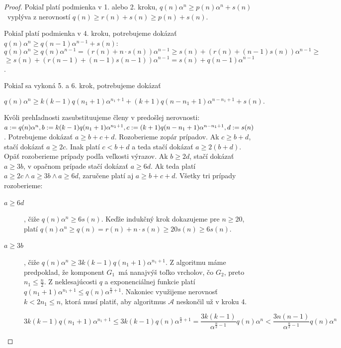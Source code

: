 \begin{proof}
    Pokiaľ platí podmienka v 1. alebo 2. kroku,
    $q(n) \alpha^n \ge p(n) \alpha^n + s(n)$ vyplýva z nerovností $q(n) \ge r(n) + s(n) \ge p(n) + s(n)$.

    Pokiaľ platí podmienka v 4. kroku, potrebujeme dokázať $q(n) \alpha^n \ge q(n-1) \alpha^{n-1} + s(n)$:
    $$ q(n) \alpha^n \ge q(n) \alpha^{n-1} = \left(r(n) + n \cdot s(n) \right) \alpha^{n-1} \ge s(n) + \left(r(n) + (n-1)s(n) \right) \alpha^{n-1} \ge $$
    $$ \ge s(n) + \left(r(n-1) + (n-1)s(n-1) \right) \alpha^{n-1} = s(n) + q(n-1) \alpha^{n-1}$$.

    Pokiaľ sa vykoná 5. a 6. krok, potrebujeme dokázať

    $$q(n) \alpha^n \ge k(k-1)q(n_1+1)\alpha^{n_1 + 1} + (k+1)q(n - n_1 + 1)\alpha^{n - n_1 + 1} + s(n).$$

    Kvôli prehľadnosti zasubstituujeme členy v predošlej nerovnosti: $a := q(n) \alpha^n,\\ b :=  k(k-1)q(n_1+1)\alpha^{n_1 + 1},
    c := (k+1)q(n - n_1 + 1)\alpha^{n - n_1 + 1}, d := s(n)$. Potrebujeme dokázať $a \ge b + c + d$.
    Rozoberieme zopár prípadov. Ak $c \ge b + d$, stačí dokázať $a \ge 2c$. Inak platí $c < b + d$ a
    teda stačí dokázať $a \ge 2(b + d)$. Opäť rozoberieme prípady podľa veľkosti výrazov. Ak $b \ge 2d$,
    stačí dokázať $a \ge 3b$, v opačnom prípade stačí dokázať $a \ge 6d$. Ak teda platí
    $a \ge 2c \wedge a \ge 3b \wedge a \ge 6d$, zaručene platí aj $a \ge b + c + d$. Všetky
    tri prípady rozoberieme:

    \begin{description}
    \item[$\boxed{a \ge 6d}$], čiže $q(n) \alpha^n \ge 6s(n)$. Keďže indukčný
    krok dokazujeme pre $n \ge 20$, platí $q(n) \alpha^n \ge q(n) = r(n) + n\cdot s(n) \ge
    20s(n) \ge 6s(n)$.

    \item[$\boxed{a \ge 3b}$], čiže $q(n) \alpha^n \ge 3k(k-1)q(n_1 + 1)\alpha^{n_1 + 1}$.
    Z algoritmu máme predpoklad, že komponent $G_1$ má nanajvýš toľko vrcholov, čo $G_2$, preto
    $n_1 \leq \frac{n}{2}$. Z neklesajúcosti $q$ a exponenciálnej funkcie platí $q(n_1 + 1)\alpha^{n_1 + 1}
    \leq q(n) \alpha^{\frac{n}{2} + 1}$. Nakoniec využijeme nerovnosť $k < 2n_1 \leq n$, ktorá musí platiť,
    aby algoritmus $\mathcal{A}$ neskončil už v kroku 4.

    $$3k(k-1)q(n_1 + 1)\alpha^{n_1 + 1} \leq 3k(k-1)q(n)\alpha^{\frac{n}{2} + 1} = \frac{3k(k-1)}{\alpha^{\frac{n}{2} - 1}}q(n)\alpha^n < \frac{3n(n-1)}{\alpha^{\frac{n}{2} - 1}}q(n)\alpha^n$$


\end{description}
\end{proof}
